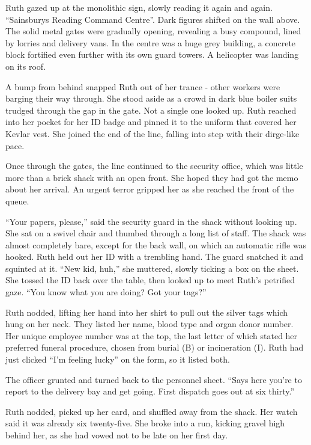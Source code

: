 Ruth gazed up at the monolithic sign, slowly reading it again and again. “Sainsburys Reading Command Centre”. Dark figures shifted on the wall above. The solid metal gates were gradually opening, revealing a busy compound, lined by lorries and delivery vans. In the centre was a huge grey building, a concrete block fortified even further with its own guard towers.  A helicopter was landing on its roof. 

A bump from behind snapped Ruth out of her trance - other workers were barging their way through. She stood aside as a crowd in dark blue boiler suits trudged through the gap in the gate. Not a single one looked up. Ruth reached into her pocket for her ID badge and pinned it to the uniform that covered her Kevlar vest. She joined the end of the line, falling into step with their dirge-like pace. 

Once through the gates, the line continued to the security office, which was little more than a brick shack with an open front. She hoped they had got the memo about her arrival. An urgent terror gripped her as she reached the front of the queue. 

“Your papers, please,” said the security guard in the shack without looking up. She sat on a swivel chair and thumbed through a long list of staff. The shack was almost completely bare, except for the back wall, on which an automatic rifle was hooked. Ruth held out her ID with a trembling hand. The guard snatched it and squinted at it. “New kid, huh,” she muttered, slowly ticking a box on the sheet. She tossed the ID back over the table, then looked up to meet Ruth’s petrified gaze. “You know what you are doing? Got your tags?”

Ruth nodded, lifting her hand into her shirt to pull out the silver tags which hung on her neck. They listed her name, blood type and organ donor number. Her unique employee number was at the top, the last letter of which stated her preferred funeral procedure, chosen from burial (B) or incineration (I). Ruth had just clicked “I’m feeling lucky” on the form, so it listed both. 

The officer grunted and turned back to the personnel sheet. “Says here you’re to report to the delivery bay and get going. First dispatch goes out at six thirty.” 

Ruth nodded, picked up her card, and shuffled away from the shack. Her watch said it was already six twenty-five. She broke into a run, kicking gravel high behind her, as she had vowed not to be late on her first day.

